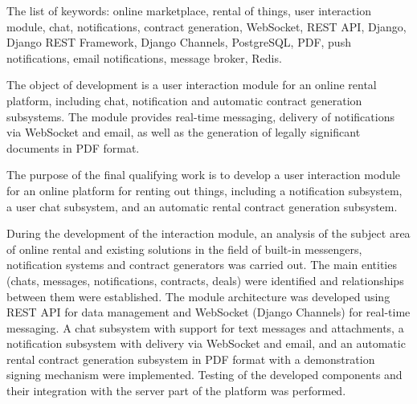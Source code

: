 The list of keywords: online marketplace, rental of things, user interaction module, chat, notifications, contract generation, WebSocket, REST API, Django, Django REST Framework, Django Channels, PostgreSQL, PDF, push notifications, email notifications, message broker, Redis.

The object of development is a user interaction module for an online rental platform, including chat, notification and automatic contract generation subsystems. The module provides real-time messaging, delivery of notifications via WebSocket and email, as well as the generation of legally significant documents in PDF format.

The purpose of the final qualifying work is to develop a user interaction module for an online platform for renting out things, including a notification subsystem, a user chat subsystem, and an automatic rental contract generation subsystem.

During the development of the interaction module, an analysis of the subject area of online rental and existing solutions in the field of built-in messengers, notification systems and contract generators was carried out. The main entities (chats, messages, notifications, contracts, deals) were identified and relationships between them were established. The module architecture was developed using REST API for data management and WebSocket (Django Channels) for real-time messaging. A chat subsystem with support for text messages and attachments, a notification subsystem with delivery via WebSocket and email, and an automatic rental contract generation subsystem in PDF format with a demonstration signing mechanism were implemented. Testing of the developed components and their integration with the server part of the platform was performed.

